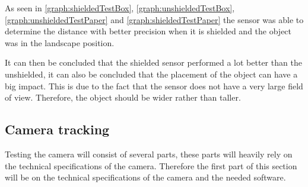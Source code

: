

As seen in \autoref{graph:shieldedTestBox}, \autoref{graph:unshieldedTestBox},
\autoref{graph:unshieldedTestPaper} and \autoref{graph:shieldedTestPaper} the
sensor was able to determine the distance with better precision when it is
shielded and the object was in the landscape position. \nl

It can then be concluded that the shielded sensor performed a lot better than
the unshielded, it can also be concluded that the placement of the object can
have a big impact. This is due to the fact that the sensor does not have a very
large field of view. Therefore, the object should be wider rather than taller. 

% 
% 

\subsection{Camera tracking}%
Testing the camera will consist of several parts, these parts will heavily rely
on the technical specifications of the camera. Therefore the first part of this
section will be on the technical specifications of the camera and the needed
software.\nl

